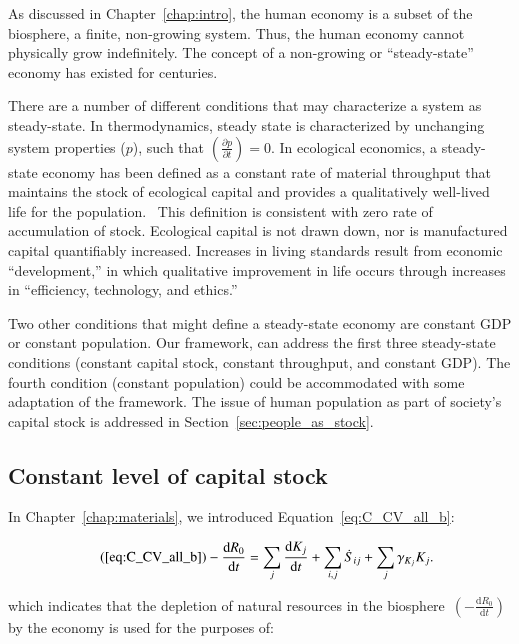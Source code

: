 As discussed in Chapter~\ref{chap:intro},
the human economy is a subset of the biosphere, 
a finite, non-growing system.
Thus, the human economy cannot physically grow indefinitely.
The concept of a non-growing or ``steady-state'' economy
has existed for centuries.

There are a number of different
conditions that may characterize a system as steady-state.
In thermodynamics,
steady state is characterized by unchanging system properties ($p$),
such that $\left(\frac{\partial p}{\partial t}\right) = 0$.
In ecological economics, a steady-state
economy has been defined as a constant rate
of material throughput that maintains the stock
of ecological capital and provides a qualitatively well-lived life 
for the population.~\cite[p.~32]{Daly1997}  
This definition is consistent
with zero rate of accumulation of stock. 
Ecological capital is not drawn down, 
nor is manufactured capital quantifiably increased. 
Increases in living standards result from economic ``development,'' 
in which qualitative 
improvement in life occurs through increases 
in ``efficiency, technology, and ethics.''~\cite[p.~167]{Daly1997} 

Two other conditions that might define a steady-state
economy are constant GDP or constant population.
Our framework, can address the first three steady-state conditions
(constant capital stock, constant throughput, and constant GDP).
The fourth condition (constant population) could be
accommodated with some adaptation of the 
framework. 
The issue of human population as part of society's
capital stock is addressed in Section~\ref{sec:people_as_stock}.


\subsection{Constant level of capital stock}

In Chapter~\ref{chap:materials}, 
we introduced Equation~\ref{eq:C_CV_all_b}:

\begin{align}\tag{\ref{eq:C_CV_all_b}}
	- \frac{\mathrm{d}R_{0}}{\mathrm{d}t}										&
	=\sum_{j}\frac{\mathrm{d}K_{j}}{\mathrm{d}t}
	+ \sum_{i,j}\dot{S}_{ij}
	+ \sum_{j}\gamma_{K_{j}}K_{j}.
\end{align}

\noindent{}which indicates that 
the depletion of natural resources in the 
biosphere~$\left(- \frac{\mathrm{d}R_{0}}{\mathrm{d}t}\right)$
by the economy
is used for the purposes of:

